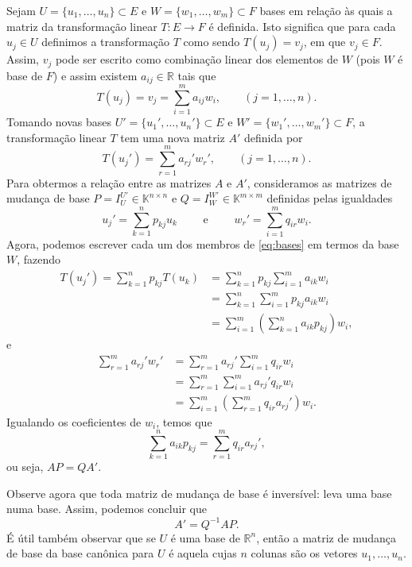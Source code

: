 Sejam $U=\{u_1,\ldots,u_n\}\subset E$ e $W=\{w_1,\ldots,w_m\}\subset F$ bases em relação às quais a matriz da transformação linear $T:E\rightarrow F$ é definida. Isto significa que para cada $u_j \in U$ definimos a transformação $T$ como sendo $T(u_j) = v_j$, em que $v_j \in F$. Assim, $v_j$ pode ser escrito como combinação linear dos elementos de $W$ (pois $W$ é base de $F$) e assim existem $a_{ij}\in {\mathbb{R}}$ tais que
\begin{equation*}
   T(u_j) = v_j = \sum_{i=1}^m a_{ij}w_i, \qquad (j=1,\ldots,n).
\end{equation*}
Tomando novas bases $U'=\{u_1',\ldots,u_n'\}\subset E$ e $W'=\{w_1',\ldots,w_m'\}\subset F$, a transformação linear $T$ tem uma nova matriz $A'$ definida por
\begin{equation}\label{eq:bases}
  T(u_j') = \sum_{r=1}^m a_{rj}'w_r', \qquad (j=1,\ldots,n).
\end{equation}
Para obtermos a relação entre as matrizes $A$ e $A'$, consideramos as matrizes de mudança de base $P = I^{U'}_U\in {\mathbb{K}}^{n\times n}$ e $Q = I^{W'}_{W}\in {\mathbb{K}}^{m\times m}$ definidas pelas igualdades
\begin{equation*}
  u_j'=\sum_{k=1}^n p_{kj}u_k \qquad \mbox{ e } \qquad w_r'=\sum_{i=1}^m q_{ir}w_i.
\end{equation*}
Agora, podemos escrever cada um dos membros de \eqref{eq:bases} em termos da base $W$, fazendo
\begin{align*}
  T(u_j') = \sum_{k=1}^n p_{kj}T(u_k) &= \sum_{k=1}^n p_{kj}\sum_{i=1}^m a_{ik}w_i\\
  &= \sum_{k=1}^n \sum_{i=1}^m p_{kj}a_{ik} w_i\\
  &= \sum_{i=1}^m \left( \sum_{k=1}^n a_{ik}p_{kj}\right) w_i,
\end{align*}
e
\begin{align*}
  \sum_{r=1}^m a_{rj}'w_r'&=\sum_{r=1}^m a_{rj}' \sum_{i=1}^m q_{ir}w_i\\
  &= \sum_{r=1}^m \sum_{i=1}^m a_{rj}'q_{ir}w_i\\
  &= \sum_{i=1}^m \left( \sum_{r=1}^m q_{ir}a_{rj}' \right) w_i.
\end{align*}
Igualando os coeficientes de $w_i$, temos que
\begin{equation*}
  \sum_{k=1}^n a_{ik}p_{kj} = \sum_{r=1}^m q_{ir}a_{rj}',
\end{equation*}
ou seja, $AP = QA'$.

Observe agora que toda matriz de mudança de base é inversível: leva uma base numa base. Assim, podemos concluir que
\begin{equation*}
  A'=Q^{-1}AP.
\end{equation*}
É útil também observar que se $U$ é uma base de ${\mathbb{R}}^n$, então a matriz de mudança de base da base canônica para $U$ é aquela cujas $n$ colunas são os vetores $u_1,\ldots,u_n$.

